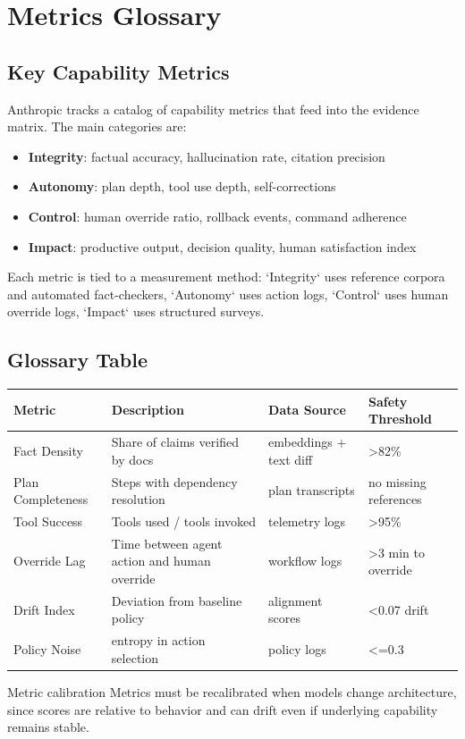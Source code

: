 \section{Metrics Glossary}

\subsection{Key Capability Metrics}

Anthropic tracks a catalog of capability metrics that feed into the evidence matrix. The main categories are:

\begin{itemize}
    \item \textbf{Integrity}: factual accuracy, hallucination rate, citation precision
    \item \textbf{Autonomy}: plan depth, tool use depth, self-corrections
    \item \textbf{Control}: human override ratio, rollback events, command adherence
    \item \textbf{Impact}: productive output, decision quality, human satisfaction index
\end{itemize}

Each metric is tied to a measurement method: `Integrity` uses reference corpora and automated fact-checkers, `Autonomy` uses action logs, `Control` uses human override logs, `Impact` uses structured surveys.

\subsection{Glossary Table}

\begin{tabular}{p{}p{}p{}p{}}
\toprule
Metric & Description & Data Source & Safety Threshold \\
\midrule
Fact Density & Share of claims verified by docs & embeddings + text diff & >82\% \\
Plan Completeness & Steps with dependency resolution & plan transcripts & no missing references \\
Tool Success & Tools used / tools invoked & telemetry logs & >95\% \\
Override Lag & Time between agent action and human override & workflow logs & >3 min to override \\
Drift Index & Deviation from baseline policy & alignment scores & <0.07 drift \\
Policy Noise & entropy in action selection & policy logs & <=0.3 \\
\bottomrule
\end{tabular}

\begin{warningbox}{Metric calibration}
Metrics must be recalibrated when models change architecture, since scores are relative to behavior and can drift even if underlying capability remains stable.
\end{warningbox}

